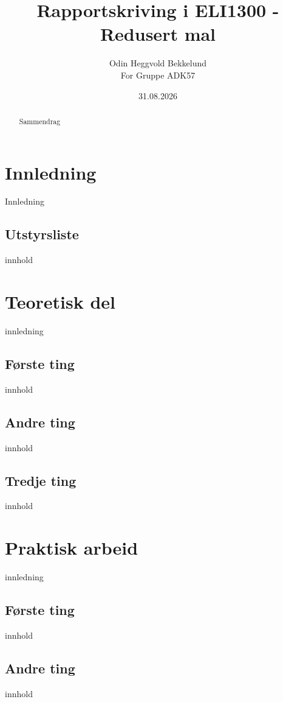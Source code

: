 \documentclass[11pt,a4paper,twocolumn]{article}
\title{Rapportskriving i ELI1300 - Redusert mal}
\author{Odin Heggvold Bekkelund\\For Gruppe ADK57}
\date{31.08.2026}
\begin{document}
\maketitle %

\begin{abstract}
Sammendrag
\end{abstract}


\section{Innledning}
Innledning

\subsection{Utstyrsliste}
innhold

\section{Teoretisk del}
innledning

\subsection{Første ting}
innhold

\subsection{Andre ting}
innhold

\subsection{Tredje ting}
innhold

\section{Praktisk arbeid}
innledning

\subsection{Første ting}
innhold

\subsection{Andre ting}
innhold
\end{document}
